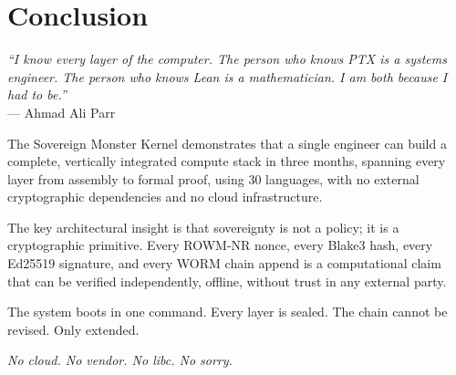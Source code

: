 \documentclass[11pt,a4paper]{article}
\begin{document}
\section{Conclusion}

\begin{authorvoice}
\textit{``I know every layer of the computer. The person who knows PTX
is a systems engineer. The person who knows Lean is a mathematician.
I am both because I had to be.''}\\
\hfill --- Ahmad Ali Parr
\end{authorvoice}

The Sovereign Monster Kernel demonstrates that a single engineer can
build a complete, vertically integrated compute stack in three months,
spanning every layer from assembly to formal proof, using 30 languages,
with no external cryptographic dependencies and no cloud infrastructure.

The key architectural insight is that sovereignty is not a policy; it
is a cryptographic primitive. Every ROWM-NR nonce, every Blake3 hash,
every Ed25519 signature, and every WORM chain append is a computational
claim that can be verified independently, offline, without trust in
any external party.

The system boots in one command. Every layer is sealed. The chain cannot
be revised. Only extended.

\begin{center}
\textit{No cloud. No vendor. No libc. No sorry.}
\end{center}
\end{document}
